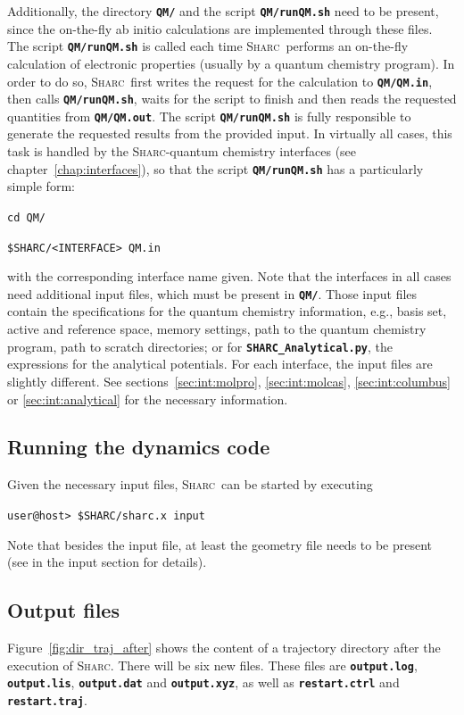 \documentclass[a4paper,11pt,DIV=15,openany,twoside=false]{scrbook}
\newcommand{\sharc}{\textsc{Sharc}}
\newcommand{\ttt}[1]{\textbf{\texttt{#1}}}
\newenvironment{example}{
  \vspace{0mm}
  \definecolor{shadecolor}{HTML}{E4F4FF}
  \begin{shaded}
}{
  \end{shaded}
}
\begin{document}
Additionally, the directory \ttt{QM/} and the script \ttt{QM/runQM.sh} need to be present, since the on-the-fly ab initio calculations are implemented through these files. The script \ttt{QM/runQM.sh} is called each time \sharc\ performs an on-the-fly calculation of electronic properties (usually by a quantum chemistry program). In order to do so, \sharc\ first writes the request for the calculation to \ttt{QM/QM.in}, then calls \ttt{QM/runQM.sh}, waits for the script to finish and then reads the requested quantities from \ttt{QM/QM.out}. The script \ttt{QM/runQM.sh} is fully responsible to generate the requested results from the provided input. 
In virtually all cases, this task is handled by the \sharc-quantum chemistry interfaces (see chapter~\ref{chap:interfaces}), so that the script \ttt{QM/runQM.sh} has a particularly simple form:
\begin{example}
\verb|cd QM/|

\verb|$SHARC/<INTERFACE> QM.in |
\end{example}
with the corresponding interface name given. Note that the interfaces in all cases need additional input files, which must be present in \ttt{QM/}. Those input files contain the specifications for the quantum chemistry information, e.g., basis set, active and reference space, memory settings, path to the quantum chemistry program, path to scratch directories; or for \ttt{SHARC\_Analytical.py}, the expressions for the analytical potentials. For each interface, the input files are slightly different. See sections~\ref{sec:int:molpro}, \ref{sec:int:molcas}, \ref{sec:int:columbus} or \ref{sec:int:analytical} for the necessary information.

\subsection{Running the dynamics code}

Given the necessary input files, \sharc\ can be started by executing
\begin{example}
\verb|user@host> $SHARC/sharc.x input|
\end{example}
Note that besides the input file, at least the geometry file needs to be present (see in the input section for details).

\subsection{Output files}

Figure~\ref{fig:dir_traj_after} shows the content of a trajectory directory after the execution of \sharc. There will be six new files. These files are \ttt{output.log}, \ttt{output.lis}, \ttt{output.dat} and \ttt{output.xyz}, as well as \ttt{restart.ctrl} and \ttt{restart.traj}.
\end{document}
